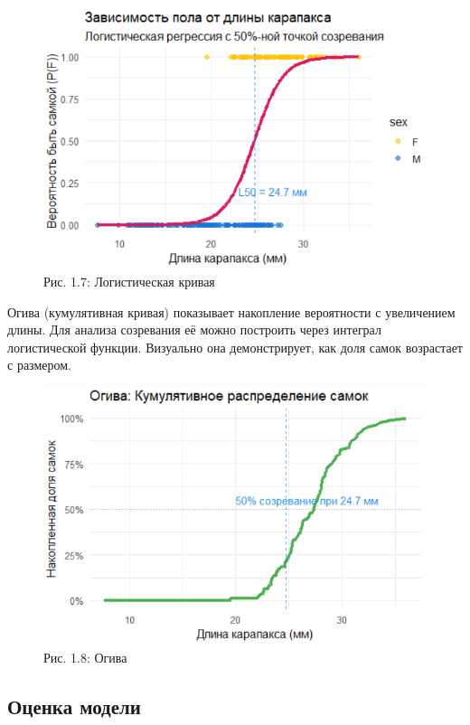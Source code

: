 \documentclass[
  letterpaper,
  DIV=11,
  numbers=noendperiod]{scrreprt}
\begin{document}
\begin{figure}[H]

{\centering \includegraphics[width=0.6\linewidth,height=\textheight,keepaspectratio]{images/logistic_model_shrimp.PNG}

}

\caption{Рис. 1.7: Логистическая кривая}

\end{figure}%

Огива (кумулятивная кривая) показывает накопление вероятности с
увеличением длины. Для анализа созревания её можно построить через
интеграл логистической функции. Визуально она демонстрирует, как доля
самок возрастает с размером.

\begin{figure}[H]

{\centering \includegraphics[width=0.6\linewidth,height=\textheight,keepaspectratio]{images/ogive_shrimp.PNG}

}

\caption{Рис. 1.8: Огива}

\end{figure}%

\subsection{\texorpdfstring{\textbf{Оценка
модели}}{Оценка модели}}\label{ux43eux446ux435ux43dux43aux430-ux43cux43eux434ux435ux43bux438}
\end{document}
